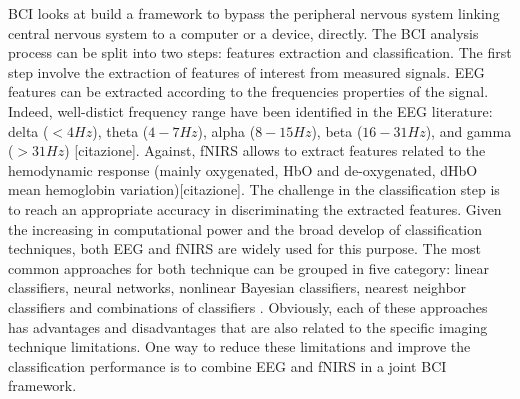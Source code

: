 \documentclass[12pt ]{iopart}
\begin{document}
BCI looks at build a framework to bypass the peripheral nervous system linking central nervous system to a computer or a device, directly. The BCI analysis process can be split into two steps: features extraction and classification. The first step involve the extraction of features of interest from measured signals. EEG features can be extracted according to the frequencies properties of the signal. Indeed, well-distict frequency range have been identified in the EEG literature: delta ($< 4 Hz$), theta ($4-7 Hz$), alpha ($8-15 Hz$), beta ($16-31 Hz$), and gamma ($> 31 Hz$) [citazione]. Against, fNIRS allows to extract features related to the hemodynamic response (mainly oxygenated, HbO and de-oxygenated, dHbO mean hemoglobin variation)[citazione]. The challenge in the classification step is to reach an appropriate accuracy in discriminating the extracted features. Given the increasing in computational power and the broad develop of classification techniques, both EEG and fNIRS are widely used for this purpose. The most common approaches for both technique can be grouped in five category: linear classifiers, neural networks, nonlinear Bayesian classifiers, nearest neighbor classifiers and combinations of classifiers \parencite{lotte2007review}. Obviously, each of these approaches has advantages and disadvantages that are also related to the specific imaging technique limitations. One way to reduce these limitations and improve the classification performance is to combine EEG and fNIRS in a joint BCI framework. 
\end{document}
